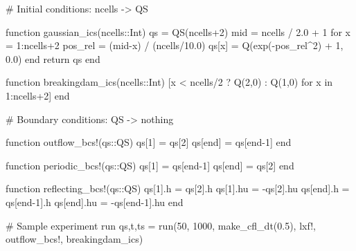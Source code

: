 \begin{myjulia}
# Initial conditions: ncells -> QS

function gaussian_ics(ncells::Int)
    qs = QS(ncells+2)
    mid = ncells / 2.0 + 1
    for x = 1:ncells+2
        pos_rel = (mid-x) / (ncells/10.0)
        qs[x] = Q(exp(-pos_rel^2) + 1, 0.0)
    end
    return qs
end

function breakingdam_ics(ncells::Int)
    [x < ncells/2 ? Q(2,0) : Q(1,0) for x in 1:ncells+2]
end
\end{myjulia}

\begin{myjulia}
# Boundary conditions: QS -> nothing 

function outflow_bcs!(qs::QS)
    qs[1] = qs[2]
    qs[end] = qs[end-1]
end

function periodic_bcs!(qs::QS)
    qs[1] = qs[end-1]
    qs[end] = qs[2]
end

function reflecting_bcs!(qs::QS)
    qs[1].h = qs[2].h
    qs[1].hu = -qs[2].hu
    qs[end].h = qs[end-1].h
    qs[end].hu = -qs[end-1].hu
end
\end{myjulia}

\begin{myjulia}

# Sample experiment run
qs,t,ts = run(50, 1000, make_cfl_dt(0.5), 
              lxf!, outflow_bcs!, breakingdam_ics)

\end{myjulia}

